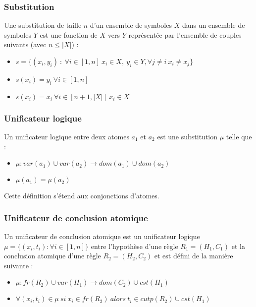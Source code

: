 
\subsubsection{Substitution}\label{def_unification}
Une substitution de taille $n$ d'un ensemble de symboles $X$ dans un ensemble de symboles $Y$ est une fonction de $X$ 
vers $Y$ repr\'esent\'ee par l'ensemble de couples suivants (avec $n \leq |X|$) :
\begin{itemize}
	\item $s = \{(x_{i},y_{i})\ :\ \forall i \in [1,n]\ x_{i} \in X,\ y_{i} \in Y, \forall j \neq i\ x_{i} \neq x_{j}\}$
	\item $s(x_{i}) = y_{i}\ \forall i \in [1,n]$
	\item $s(x_{i}) = x_{i}\ \forall i \in [n+1,|X|]\ x_{i} \in X$
\end{itemize}

\subsubsection{Unificateur logique}\label{def_unificateur}
Un unificateur logique entre deux atomes $a_{1}$ et $a_{2}$ est une substitution $\mu$ telle que :
\begin{itemize}
	\item $\mu : var(a_{1}) \cup var(a_{2}) \rightarrow dom(a_{1}) \cup dom(a_{2})$
	\item $\mu(a_{1}) = \mu(a_{2})$
\end{itemize}
Cette d\'efinition s'\'etend aux conjonctions d'atomes.

\subsubsection{Unificateur de conclusion atomique}\label{def_unificateuratomique}
Un unificateur de conclusion atomique est un unificateur logique $\mu = \{(x_{i},t_{i}) : \forall i \in [1,n]\}$
entre l'hypoth\`ese d'une r\`egle $R_{1} = (H_{1},C_{1})$ et la conclusion atomique d'une r\`egle $R_{2} = (H_{2},C_{2})$ et est d\'efini de la mani\`ere suivante :
\begin{itemize}
	\item $\mu : fr(R_{2}) \cup var(H_{1}) \rightarrow dom(C_{2}) \cup cst(H_{1})$
	\item $\forall (x_{i},t_{i}) \in \mu\ si\ x_{i} \in fr(R_{2})\ alors\ t_{i} \in cutp(R_{2}) \cup cst(H_{1})$
\end{itemize}
    
